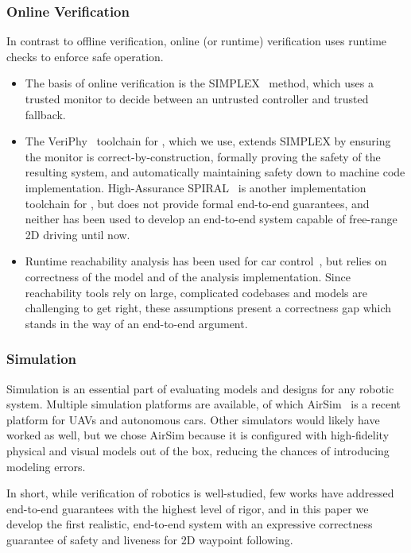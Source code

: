 \documentclass[12pt]{cmuthesis}
\theoremstyle{definition}
\theoremstyle{remark}
\newcommand{\VeriPhy}{VeriPhy\xspace}
\begin{document}
\subsubsection{Online Verification}
In contrast to offline verification, online (or runtime) verification uses runtime checks to enforce safe operation.
\begin{itemize}
\item The basis of online verification is the SIMPLEX~\cite{Krogh1998TheSA} method, which uses a trusted monitor to decide between an untrusted controller and trusted fallback.
\item The \VeriPhy~\cite{DBLP:conf/pldi/BohrerTMMP18} toolchain for \dL, which we use, extends SIMPLEX by ensuring the monitor is correct-by-construction, formally proving the safety of the resulting system, and automatically maintaining safety down to machine code implementation.
High-Assurance SPIRAL~\cite{DBLP:journals/csm/FranchettiLMMGPPKMFJPV17} is another implementation toolchain for \dL, but does not provide formal end-to-end guarantees, and neither has been used to develop an end-to-end system capable of free-range 2D driving until now.
\item Runtime reachability analysis has been used for car control~\cite{DBLP:journals/trob/AlthoffD14}, but relies on correctness of the model and of the analysis implementation.
Since reachability tools rely on large, complicated codebases and models are challenging to get right, these assumptions present a correctness gap which stands in the way of an end-to-end argument.
\end{itemize}

\subsubsection{Simulation}
Simulation is an essential part of evaluating models and designs for any robotic system.
Multiple simulation platforms are available, of which AirSim~\cite{shah2018airsim} is a recent platform for UAVs and autonomous cars.
Other simulators would likely have worked as well, but we chose AirSim because it is configured with high-fidelity physical and visual models out of the box, reducing the chances of introducing modeling errors.

In short, while verification of robotics is well-studied, few works have addressed end-to-end guarantees with the highest level of rigor, and in this paper we develop the first realistic, end-to-end system with an expressive correctness guarantee of safety and liveness for 2D waypoint following.
\end{document}
